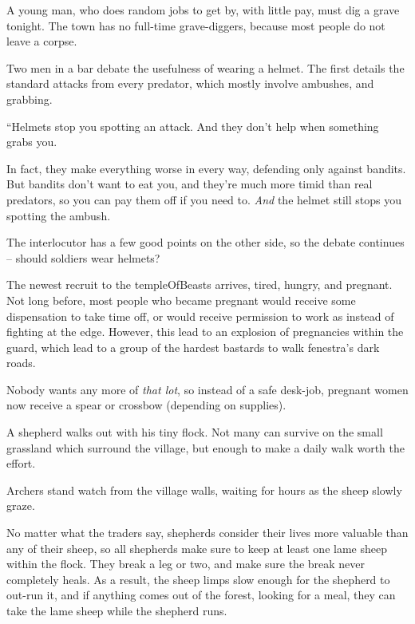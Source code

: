 \begin{multicols}{2}
\begin{exampletext}
  A young man, who does random jobs to get by, with little pay, must dig a grave tonight.
  The town has no full-time grave-diggers, because most people do not leave a corpse.
\end{exampletext}

\begin{exampletext}
  Two men in a bar debate the usefulness of wearing a helmet.
  The first details the standard attacks from every predator, which mostly involve ambushes, and grabbing.

  \begin{speechtext}
    ``Helmets stop you spotting an attack.
    And they don't help when something grabs you.

    In fact, they make everything worse in every way, defending only against bandits.
    But bandits don't want to eat you, and they're much more timid than real predators, so you can pay them off if you need to.
    \emph{And} the helmet still stops you spotting the ambush.
  \end{speechtext}

  The interlocutor has a few good points on the other side, so the debate continues -- should soldiers wear helmets?
\end{exampletext}

\begin{exampletext}
  The newest recruit to the \gls{templeOfBeasts} arrives, tired, hungry, and pregnant.
  Not long before, most people who became pregnant would receive some dispensation to take time off, or would receive permission to work as  instead of fighting at the \gls{edge}.
  However, this lead to an explosion of pregnancies within the \gls{guard}, which lead to a group of the hardest bastards to walk \gls{fenestra}'s dark roads.

  Nobody wants any more of \emph{that lot}, so instead of a safe desk-job, pregnant women now receive a spear or crossbow (depending on supplies).
\end{exampletext}

\begin{exampletext}
  A shepherd walks out with his tiny flock.
  Not many can survive on the small grassland which surround the \gls{village}, but enough to make a daily walk worth the effort.

  Archers stand watch from the \gls{village} walls, waiting for hours as the sheep slowly graze.

  No matter what the traders say, shepherds consider their lives more valuable than any of their sheep, so all shepherds make sure to keep at least one lame sheep within the flock.
  They break a leg or two, and make sure the break never completely heals.
  As a result, the sheep limps slow enough for the shepherd to out-run it, and if anything comes out of the forest, looking for a meal, they can take the lame sheep while the shepherd runs.
\end{exampletext}


\end{multicols}
